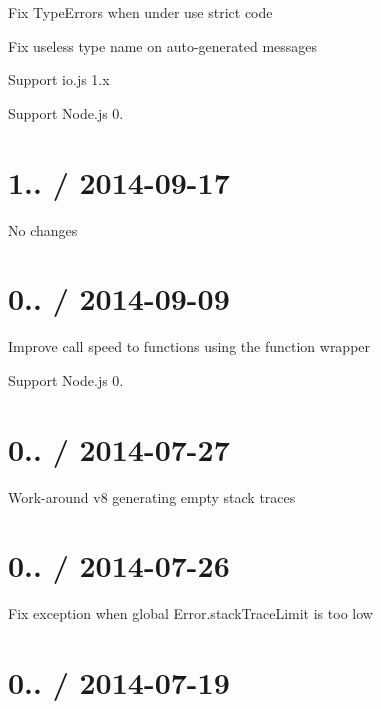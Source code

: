 
\begin{DoxyItemize}
\item Fix {\ttfamily Type\+Error}s when under {\ttfamily \textquotesingle{}use strict\textquotesingle{}} code
\item Fix useless type name on auto-\/generated messages
\item Support io.\+js 1.\+x
\item Support Node.\+js 0.
\end{DoxyItemize}

\section*{1.. / 2014-\/09-\/17 }


\begin{DoxyItemize}
\item No changes
\end{DoxyItemize}

\section*{0.. / 2014-\/09-\/09 }


\begin{DoxyItemize}
\item Improve call speed to functions using the function wrapper
\item Support Node.\+js 0.
\end{DoxyItemize}

\section*{0.. / 2014-\/07-\/27 }


\begin{DoxyItemize}
\item Work-\/around v8 generating empty stack traces
\end{DoxyItemize}

\section*{0.. / 2014-\/07-\/26 }


\begin{DoxyItemize}
\item Fix exception when global {\ttfamily Error.\+stack\+Trace\+Limit} is too low
\end{DoxyItemize}

\section*{0.. / 2014-\/07-\/19 }


